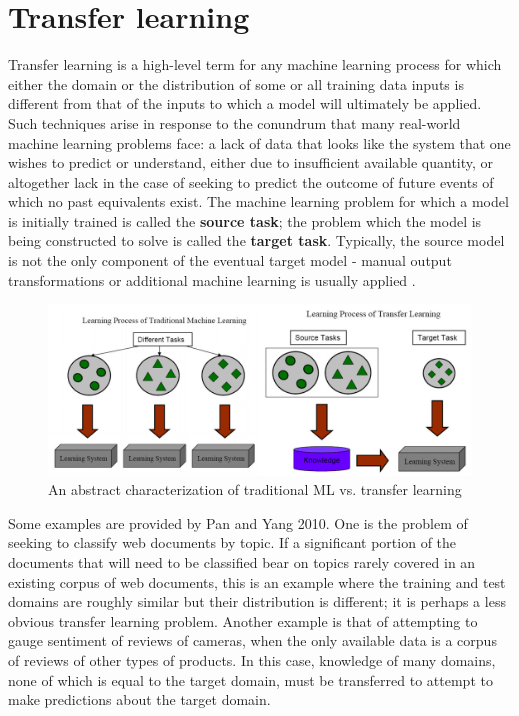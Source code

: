\section{Transfer learning}

Transfer learning is a high-level term for any machine learning process for which either the domain or the distribution of some or all training data inputs is different from that of the inputs to which a model will ultimately be applied. Such techniques arise in response to the conundrum that many real-world machine learning problems face: a lack of data that looks like the system that one wishes to predict or understand, either due to insufficient available quantity, or altogether lack in the case of seeking to predict the outcome of future events of which no past equivalents exist. The machine learning problem for which a model is initially trained is called the \textbf{source task}; the problem which the model is being constructed to solve is called the \textbf{target task}. Typically, the source model is not the only component of the eventual target model - manual output transformations or additional machine learning is usually applied \parencite{Pan2010}.

\begin{figure}[t]
\includegraphics[width=12cm]{images/transfer_learning.png}
\centering
\caption{An abstract characterization of traditional ML vs. transfer learning}
\end{figure}

Some examples are provided by Pan and Yang 2010. One is the problem of seeking to classify web documents by topic. If a significant portion of the documents that will need to be classified bear on topics rarely covered in an existing corpus of web documents, this is an example where the training and test domains are roughly similar but their distribution is different; it is perhaps a less obvious transfer learning problem. Another example is that of attempting to gauge sentiment of reviews of cameras, when the only available data is a corpus of reviews of other types of products. In this case, knowledge of many domains, none of which is equal to the target domain, must be transferred to attempt to make predictions about the target domain.

